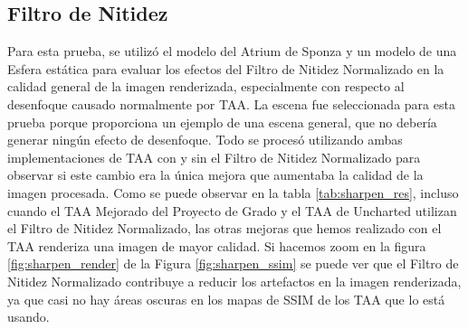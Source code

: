 \documentclass[pregrado]{tesis-usb} %
\begin{document}
\subsection{Filtro de Nitidez}
Para esta prueba, se utilizó el modelo del Atrium de Sponza y un modelo de una Esfera estática para evaluar los efectos del Filtro de Nitidez Normalizado en la calidad general de la imagen renderizada, especialmente con respecto al desenfoque causado normalmente por TAA. La escena fue seleccionada para esta prueba porque proporciona un ejemplo de una escena general, que no debería generar ningún efecto de desenfoque. Todo se procesó utilizando ambas implementaciones de TAA con y sin el Filtro de Nitidez Normalizado para observar si este cambio era la única mejora que aumentaba la calidad de la imagen procesada. Como se puede observar en la tabla \ref{tab:sharpen_res}, incluso cuando el TAA Mejorado del Proyecto de Grado y el TAA de Uncharted utilizan el Filtro de Nitidez Normalizado, las otras mejoras que hemos realizado  con el TAA renderiza una imagen de mayor calidad. Si hacemos zoom en la figura \ref{fig:sharpen_render} de la Figura \ref{fig:sharpen_ssim} se puede ver que el Filtro de Nitidez Normalizado contribuye a reducir los artefactos en la imagen renderizada, ya que casi no hay áreas oscuras en los mapas de SSIM de los TAA que lo está usando.
\end{document}
